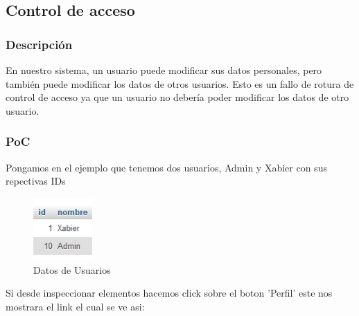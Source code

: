 \documentclass{report}
\begin{document}
            \subsection{Control de acceso}
                \subsubsection{Descripción}
                    En nuestro sistema, un usuario puede modificar sus datos personales, pero también puede modificar los datos de otros usuarios. 
                    Esto es un fallo de rotura de control de acceso ya que un usuario no debería poder modificar los datos de otro usuario.
                \subsubsection{PoC}
                    Pongamos en el ejemplo que tenemos dos usuarios, Admin y Xabier con sus repectivas IDs
                    \begin{figure}[H]
                        \centering
                        \includegraphics[width=0.2\textwidth]{./img/vulnerabilidades/3.1.1.1.png}
                        \caption{Datos de Usuarios}
                    \end{figure}
                    Si desde inspeccionar elementos hacemos click sobre el boton 'Perfil' este nos mostrara el link el cual se ve asi:
\end{document}
